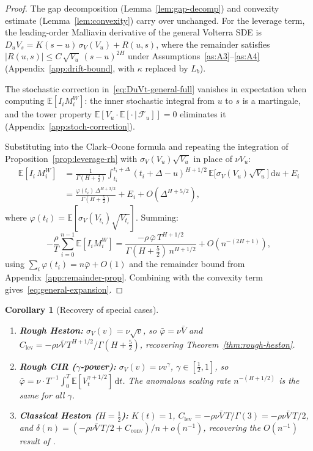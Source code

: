 \documentclass[12pt]{article}
\newtheorem{corollary}[theorem]{Corollary}
\theoremstyle{definition}
\newcommand{\E}{\mathbb{E}}
\newcommand{\dd}{\mathrm{d}}
\begin{document}
\begin{proof}
The gap decomposition (Lemma~\ref{lem:gap-decomp}) and convexity
estimate (Lemma~\ref{lem:convexity}) carry over unchanged.
For the leverage term, the leading-order Malliavin derivative of the
general Volterra SDE is $D_u V_s = K(s{-}u)\,\sigma_V(V_u) + R(u,s)$,
where the remainder satisfies
$|R(u,s)| \le C\,\sqrt{V_u}\,(s{-}u)^{2H}$
under Assumptions~\ref{as:A3}--\ref{as:A4}
(Appendix~\ref{app:drift-bound}, with $\kappa$ replaced by $L_b$).

The stochastic correction in~\eqref{eq:DuVt-general-full} vanishes
in expectation when computing $\E[I_i M_i^W]$:
the inner stochastic integral from $u$ to $s$ is a martingale, and
the tower property $\E[V_u \cdot \E[\cdot\,|\,\mathcal{F}_u]] = 0$
eliminates it (Appendix~\ref{app:stoch-correction}).

Substituting into the Clark--Ocone formula and repeating the
integration of Proposition~\ref{prop:leverage-rh} with
$\sigma_V(V_u)\sqrt{V_u}$ in place of $\nu V_u$:
\begin{align*}
  \E[I_i\, M_i^W]
  &= \frac{1}{\Gamma(H+\tfrac32)}
  \int_{t_i}^{t_i+\Delta}
  (t_i{+}\Delta{-}u)^{H+1/2}\,
  \E\bigl[\sigma_V(V_u)\sqrt{V_u}\bigr]\,\dd u
  + E_i \\
  &= \frac{\varphi(t_i)\,\Delta^{H+3/2}}
  {\Gamma(H+\tfrac52)}
  + E_i + O(\Delta^{H+5/2}),
\end{align*}
where $\varphi(t_i) = \E[\sigma_V(V_{t_i})\sqrt{V_{t_i}}]$.
Summing:
\[
  -\frac{\rho}{T}\sum_{i=0}^{n-1}\E[I_i M_i^W]
  = \frac{-\rho\,\bar\varphi\,T^{H+1/2}}
  {\Gamma(H+\tfrac52)\,n^{H+1/2}}
  + O(n^{-(2H+1)}),
\]
using $\sum_i \varphi(t_i) = n\bar\varphi + O(1)$ and the
remainder bound from Appendix~\ref{app:remainder-prop}.
Combining with the convexity term gives~\eqref{eq:general-expansion}.
\end{proof}

\begin{corollary}[Recovery of special cases]\label{cor:special-cases}
\leavevmode
\begin{enumerate}[label=(\alph*)]
\item \textbf{Rough Heston:}
  $\sigma_V(v) = \nu\sqrt{v}$, so
  $\bar\varphi = \nu\bar V$ and
  $C_{\mathrm{lev}} = -\rho\nu\bar V\,T^{H+1/2}/\Gamma(H+\tfrac52)$,
  recovering Theorem~\ref{thm:rough-heston}.

\item \textbf{Rough CIR ($\gamma$-power):}
  $\sigma_V(v) = \nu v^\gamma$, $\gamma\in[\tfrac12,1]$, so
  $\bar\varphi = \nu\cdot T^{-1}\!\int_0^T\!\E[V_t^{\gamma+1/2}]\,\dd t$.
  The anomalous scaling rate $n^{-(H+1/2)}$ is the same for all $\gamma$.

\item \textbf{Classical Heston ($H = \tfrac12$):}
  $K(t) = 1$, $C_{\mathrm{lev}} = -\rho\nu\bar V\,T/\Gamma(3)
  = -\rho\nu\bar V\,T/2$, and
  $\delta(n) = (-\rho\nu\bar V\,T/2 + C_{\mathrm{conv}})/n + o(n^{-1})$,
  recovering the $O(n^{-1})$ result of \citet{BernardCui2014}.
\end{enumerate}
\end{corollary}
\end{document}
